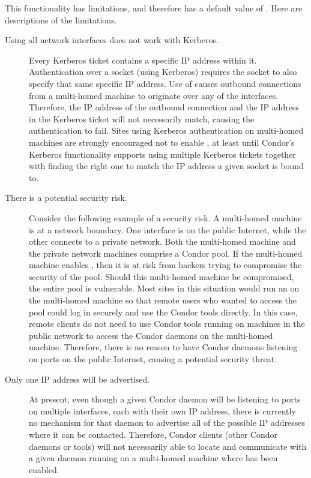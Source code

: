 This functionality has limitations,
and therefore has a default value of .
Here are descriptions of the limitations.

\begin{description}

\item[Using all network interfaces does not work with Kerberos.] 
  Every Kerberos ticket contains a specific IP address within it.
  Authentication over a socket (using Kerberos) requires
  the socket to also specify that same specific IP address.
  Use of  causes outbound
  connections from a multi-homed machine to 
  originate over any of the interfaces.
  Therefore, the IP address of the outbound connection and the IP
  address in the Kerberos ticket will not necessarily match,
  causing the authentication to fail.
  Sites using Kerberos authentication on multi-homed machines are
  strongly encouraged not to enable ,
  at least until Condor's Kerberos functionality
  supports using multiple Kerberos tickets together with finding the right one
  to match the IP address a given socket is bound to. 

\item[There is a potential security risk.]
  Consider the following example of a security risk.
  A multi-homed machine is at a network boundary.
  One interface is on the public Internet, while the other connects to
  a private network.
  Both the multi-homed machine and the private network machines
  comprise a Condor pool.
  If the multi-homed machine enables ,
  then it is at risk from hackers trying to compromise the security of the pool.
  Should this multi-homed machine be compromised,
  the entire pool is vulnerable.
  Most sites in this situation would run an  on the
  multi-homed machine so that remote users who wanted to access the
  pool could log in securely and use the Condor tools directly.
  In this case, remote clients do not need to use Condor tools running
  on machines in the public network to access the Condor daemons on
  the multi-homed machine.
  Therefore, there is no reason to have Condor daemons listening on
  ports on the public Internet, causing a potential security threat.

\item[Only one IP address will be advertised.]
  At present, even though a given Condor daemon will be listening to
  ports on multiple interfaces, each with their own IP address,
  there is currently no mechanism for that daemon to advertise all of
  the possible IP addresses where it can be contacted.
  Therefore, Condor clients (other Condor daemons or tools) will not
  necessarily able to locate and communicate with a given daemon
  running on a multi-homed machine where
   has been enabled.


\end{description}
